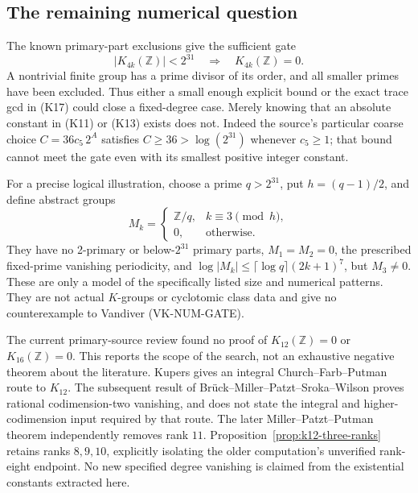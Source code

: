 \subsection{The remaining numerical question}

The known primary-part exclusions give the sufficient gate
\[
 |K_{4k}(\mathbb Z)|<2^{31}
 \quad\Longrightarrow\quad K_{4k}(\mathbb Z)=0.       \tag{K22}
\]
A nontrivial finite group has a prime divisor of its order,
and all smaller primes have been excluded. Thus either a
small enough explicit bound or the exact trace gcd in
(K17) could close a fixed-degree case. Merely knowing that
an absolute constant in (K11) or (K13) exists does not.
Indeed the source's particular coarse choice
\(C=36c_5\,2^A\) satisfies \(C\ge36>\log(2^{31})\)
whenever \(c_5\ge1\); that bound cannot meet the gate even
with its smallest positive integer constant.

For a precise logical illustration, choose a prime
\(q>2^{31}\), put \(h=(q-1)/2\), and define abstract groups
\[
 M_k=
 \begin{cases}
 \mathbb Z/q,& k\equiv3\pmod h,\\
 0,&\text{otherwise}.
 \end{cases}
\]
They have no 2-primary or below-\(2^{31}\) primary parts,
\(M_1=M_2=0\), the prescribed fixed-prime vanishing
periodicity, and
\(\log|M_k|\le\lceil\log q\rceil(2k+1)^7\), but
\(M_3\ne0\). These are only a model of the specifically
listed size and numerical patterns. They are not actual
\(K\)-groups or cyclotomic class data and give no
counterexample to Vandiver (VK-NUM-GATE).

The current primary-source review found no proof of
\(K_{12}(\mathbb Z)=0\) or \(K_{16}(\mathbb Z)=0\).
This reports the scope of the search, not an exhaustive
negative theorem about the literature.
Kupers \cite[Remark~2.6, p.~4]{Kupers2019} gives an
integral Church--Farb--Putman route to \(K_{12}\).
The subsequent result of Br\"uck--Miller--Patzt--Sroka--Wilson
\cite[Theorem~B]{BrueckEtAl2024} proves rational
codimension-two vanishing, and does not state the integral
and higher-codimension input required by that route.
The later Miller--Patzt--Putman theorem independently removes rank $11$.
Proposition~\ref{prop:k12-three-ranks} retains ranks $8,9,10$, explicitly
isolating the older computation's unverified rank-eight endpoint.
No new specified degree vanishing is claimed from the
existential constants extracted here.

